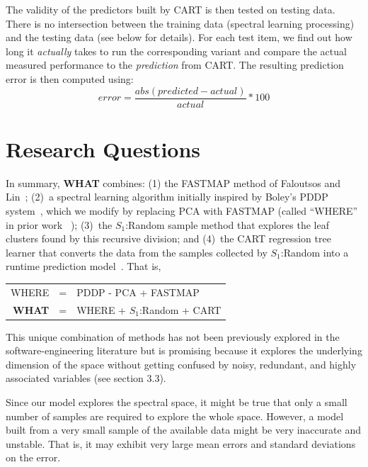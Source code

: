 \documentclass{sig-alternative}
\newcommand{\what}{{\bf WHAT }}
\begin{document}
The validity of the predictors built by CART  is then tested on testing data. There is no intersection between the training data (spectral learning processing) and the testing data (see below for details). 
For each  test item, we find out how long it {\em actually} takes to run the corresponding variant and compare the actual measured performance to the {\em prediction} from CART. The resulting prediction error is then computed using:
\begin{equation}\label{eq:err}
\mathit{error}=\frac{\mathit{abs}(\mathit{predicted} - \mathit{actual})}{\mathit{actual}}*100
\end{equation}

\section{Research Questions} 
In summary, \what  combines:
(1) the FASTMAP method of Faloutsos and Lin~\cite{Faloutsos1995};
(2)~a spectral learning algorithm initially   inspired by    Boley's PDDP system~\cite{boley98}, which we modify
by replacing  PCA with FASTMAP (called
``WHERE'' in prior work ~\cite{me12d});
(3)~the $S_1$:Random sample method that explores the leaf clusters found by this recursive division;
and (4)~the CART regression tree learner that converts the data from the samples collected by $S_1$:Random
into a runtime prediction model~\cite{breiman1984}.
That is,
\begin{center}
\begin{tabular}{rcl}
WHERE& = &PDDP - PCA + FASTMAP\\ 
\what& =  & WHERE + $S_1$:Random + CART
\end{tabular}
\end{center}
This unique combination of methods has not been previously explored in the
software-engineering literature but is promising because it explores the underlying dimension of the space without getting confused by noisy, redundant, and highly associated variables (see section 3.3).

Since our model explores the spectral space, it might be true that only a small
number of samples are required to explore the whole space.
However, a model built from a very small sample of the available data might
be very inaccurate and unstable. That is, it may exhibit very large mean errors and standard deviations on the error.
\end{document}
